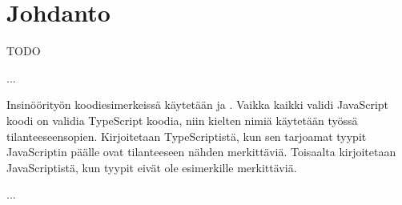 
\chapter{Johdanto}

TODO

...

Insinöörityön koodiesimerkeissä käytetään  ja . Vaikka kaikki validi JavaScript koodi on validia TypeScript koodia, niin kielten nimiä käytetään työssä tilanteeseensopien. Kirjoitetaan TypeScriptistä, kun sen tarjoamat tyypit JavaScriptin päälle ovat tilanteeseen nähden merkittäviä. Toisaalta kirjoitetaan JavaScriptistä, kun tyypit eivät ole esimerkille merkittäviä.

...